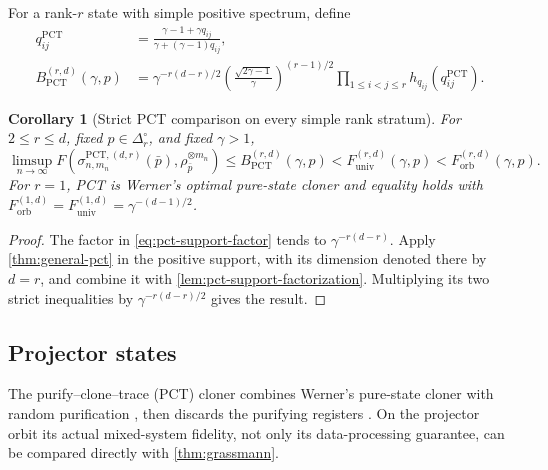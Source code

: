 \documentclass[11pt]{article}
\newtheorem{corollary}[corollary]{Corollary}
\theoremstyle{remark}
\theoremstyle{plain}
\newcommand{\ot}{\otimes}
\newcommand{\Forb}{F_{\mathrm{orb}}}
\newcommand{\Funiv}{F_{\mathrm{univ}}}
\begin{document}
For a rank-\(r\) state with simple positive spectrum, define
\begin{align}
  q_{ij}^{\mathrm{PCT}}
  &=\frac{\gamma-1+\gamma q_{ij}}
          {\gamma+(\gamma-1)q_{ij}},\\
  B_{\mathrm{PCT}}^{(r,d)}(\gamma,p)
  &=\gamma^{-r(d-r)/2}
    \left(\frac{\sqrt{2\gamma-1}}{\gamma}\right)^{(r-1)/2}
    \prod_{1\le i<j\le r}
    h_{q_{ij}}\!\left(q_{ij}^{\mathrm{PCT}}\right).
  \label{eq:rank-pct-bound}
\end{align}

\begin{corollary}[Strict PCT comparison on every simple rank stratum]
\label{cor:rank-pct-comparison}
For \(2\le r\le d\), fixed \(p\in\Delta_r^\circ\), and fixed
\(\gamma>1\),
\[
  \limsup_{n\to\infty}
  F\!\left(
    \sigma_{n,m_n}^{\mathrm{PCT},(d,r)}(\bar p),
    \rho_{\bar p}^{\ot m_n}
  \right)
  \le B_{\mathrm{PCT}}^{(r,d)}(\gamma,p)
  <\Funiv^{(r,d)}(\gamma,p)<\Forb^{(r,d)}(\gamma,p).
\]
For \(r=1\), PCT is Werner's optimal pure-state cloner and equality holds
with \(\Forb^{(1,d)}=\Funiv^{(1,d)}=\gamma^{-(d-1)/2}\).
\end{corollary}

\begin{proof}
The factor in \eqref{eq:pct-support-factor} tends to
\(\gamma^{-r(d-r)}\).  Apply \cref{thm:general-pct} in the positive
support, with its dimension denoted there by \(d=r\), and combine it with
\cref{lem:pct-support-factorization}.  Multiplying its two strict
inequalities by \(\gamma^{-r(d-r)/2}\) gives the result.
\end{proof}
\subsection{Projector states}
\label{sec:grassmann-pct-comparison}

The purify--clone--trace (PCT) cloner combines Werner's pure-state cloner
\cite{Werner1998} with random purification \cite{TangWrightZhandry2025},
then discards the purifying registers
\cite{LiTheilHarrowChuang2026,FanizzaGrinkoScharnhorstSpilecki2026,
JeonSohnOh2026}.  On the projector orbit its actual mixed-system fidelity,
not only its data-processing guarantee, can be compared directly with
\cref{thm:grassmann}.
\end{document}
